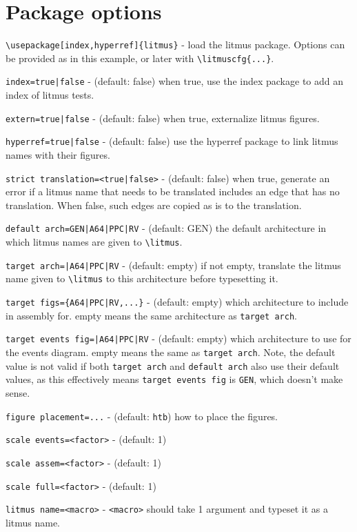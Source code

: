 \documentclass[a4paper]{article}
\begin{document}
\section{Package options}

\verb|\usepackage[index,hyperref]{litmus}| - load the litmus package. Options
can be provided as in this example, or later with \verb|\litmuscfg{...}|.

\verb!index=true|false! - (default: false) when true, use the index package
to add an index of litmus tests.

\verb!extern=true|false! - (default: false) when true, externalize litmus
figures.

\verb!hyperref=true|false! - (default: false) use the hyperref package to
link litmus names with their figures.

\verb!strict translation=<true|false>! - (default: false) when true, generate an error if a
litmus name that needs to be translated includes an edge that has no
translation. When false, such edges are copied as is to the translation.

\verb!default arch=GEN|A64|PPC|RV! - (default: GEN) the default architecture
in which litmus names are given to \verb!\litmus!.

\verb!target arch=|A64|PPC|RV! - (default: empty) if not empty, translate the
litmus name given to \verb!\litmus! to this architecture before typesetting it.

\verb!target figs={A64|PPC|RV,...}! - (default: empty) which architecture to
include in assembly for. empty means the same architecture as
\verb!target arch!.

\verb!target events fig=|A64|PPC|RV! - (default: empty) which architecture to
use for the events diagram. empty means the same as \verb!target arch!. Note,
the default value is not valid if both \verb!target arch! and
\verb!default arch! also use their default values, as this effectively means
\verb!target events fig! is \verb!GEN!, which doesn't make sense.

\verb!figure placement=...! - (default: \verb!htb!) how to place the figures.

\verb!scale events=<factor>! - (default: 1)

\verb!scale assem=<factor>! - (default: 1)

\verb!scale full=<factor>! - (default: 1)

\verb!litmus name=<macro>! - \verb!<macro>! should take 1 argument and typeset
it as a litmus name.
\end{document}
